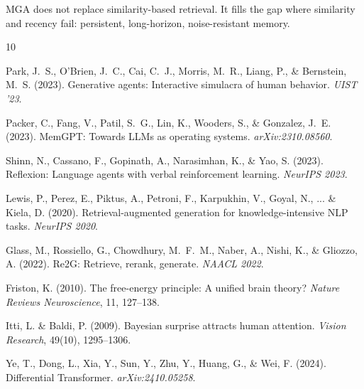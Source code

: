 \documentclass[11pt,a4paper]{article}
\begin{document}
MGA does not replace similarity-based retrieval. It fills the gap where similarity and recency fail: persistent, long-horizon, noise-resistant memory.


\begin{thebibliography}{10}

Park, J.~S., O'Brien, J.~C., Cai, C.~J., Morris, M.~R., Liang, P., \& Bernstein, M.~S. (2023).
Generative agents: Interactive simulacra of human behavior.
\textit{UIST '23}.

Packer, C., Fang, V., Patil, S.~G., Lin, K., Wooders, S., \& Gonzalez, J.~E. (2023).
MemGPT: Towards LLMs as operating systems.
\textit{arXiv:2310.08560}.

Shinn, N., Cassano, F., Gopinath, A., Narasimhan, K., \& Yao, S. (2023).
Reflexion: Language agents with verbal reinforcement learning.
\textit{NeurIPS 2023}.

Lewis, P., Perez, E., Piktus, A., Petroni, F., Karpukhin, V., Goyal, N., ... \& Kiela, D. (2020).
Retrieval-augmented generation for knowledge-intensive NLP tasks.
\textit{NeurIPS 2020}.

Glass, M., Rossiello, G., Chowdhury, M.~F.~M., Naber, A., Nishi, K., \& Gliozzo, A. (2022).
Re2G: Retrieve, rerank, generate.
\textit{NAACL 2022}.

Friston, K. (2010).
The free-energy principle: A unified brain theory?
\textit{Nature Reviews Neuroscience}, 11, 127--138.

Itti, L. \& Baldi, P. (2009).
Bayesian surprise attracts human attention.
\textit{Vision Research}, 49(10), 1295--1306.

Ye, T., Dong, L., Xia, Y., Sun, Y., Zhu, Y., Huang, G., \& Wei, F. (2024).
Differential Transformer.
\textit{arXiv:2410.05258}.

\end{thebibliography}
\end{document}
